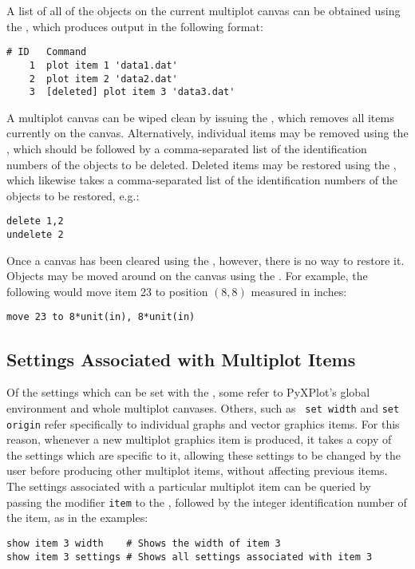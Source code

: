 A list of all of the objects on the current multiplot canvas can be obtained
using the , which produces output in the following format:
\begin{verbatim}
# ID   Command
    1  plot item 1 'data1.dat'
    2  plot item 2 'data2.dat'
    3  [deleted] plot item 3 'data3.dat'
\end{verbatim}

A multiplot canvas can be wiped clean by issuing the , which
removes all items currently on the canvas. Alternatively, individual items may
be removed using the , which should be followed by a
comma-separated list of the identification numbers of the objects to be
deleted.  Deleted items may be restored using the , which
likewise takes a comma-separated list of the identification numbers of the
objects to be restored, e.g.:
\begin{verbatim}
delete 1,2
undelete 2
\end{verbatim}
Once a canvas has been cleared using the , however, there is no
way to restore it.  Objects may be moved around on the canvas using the
. For example, the following would move item 23 to position
$(8,8)$ measured in inches:
\begin{verbatim}
move 23 to 8*unit(in), 8*unit(in)
\end{verbatim}

\subsection{Settings Associated with Multiplot Items}

Of the settings which can be set with the , some refer to
PyXPlot's global environment and whole multiplot canvases. Others, such as {\tt
set width} and {\tt set origin} refer specifically to individual graphs and
vector graphics items. For this reason, whenever a new multiplot graphics item
is produced, it takes a copy of the settings which are specific to it, allowing
these settings to be changed by the user before producing other multiplot
items, without affecting previous items. The settings associated with a
particular multiplot item can be queried by passing the modifier {\tt item} to
the , followed by the integer identification number of the item,
as in the examples:
\begin{verbatim}
show item 3 width    # Shows the width of item 3
show item 3 settings # Shows all settings associated with item 3
\end{verbatim}


